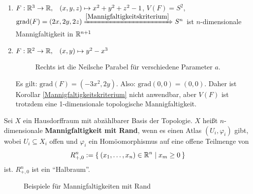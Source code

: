 \begin{beispiel}
    \begin{enumerate}[label=\alph*)]
        \item $F: \mathbb{R}^3 \rightarrow \mathbb{R},\;\;\; (x, y, z) \mapsto x^2 + y^2 + z^2 - 1$,
              $V(F) = S^2$, $\text{grad}(F) = (2x, 2y, 2z) \xRightarrow{\ref{Mannigfaltigkeitskriterium}} S^n$
              ist $n$-dimensionale Mannigfaltigkeit in $\mathbb{R}^{n+1}$
        \item $F: \mathbb{R}^2 \rightarrow \mathbb{R}, \;\;\; (x,y) \mapsto y^2 - x^3$
            \begin{figure}[ht]
                \centering
                \subfloat[$F(x,y) = y^2 - x^3$]{
                    
                    \label{fig:semicubical-parabola-2d}
                }%
                \subfloat[$y^2 - ax^3 = 0$]{
                    
                    \label{fig:semicubical-parabola-3d}
                }%
                \label{Neilsche-Parabel}
                \caption{Rechts ist die Neilsche Parabel für verschiedene Parameter $a$.}
            \end{figure}
              Es gilt: $\text{grad}(F) = (-3x^2, 2y)$. Also: $\text{grad}(0,0) = (0,0)$.
              Daher ist Korollar \ref{Mannigfaltigkeitskriterium}
              nicht anwendbar, aber $V(F)$ ist trotzdem
              eine 1-dimensionale topologische Mannigfaltigkeit.
    \end{enumerate}
\end{beispiel}

\begin{definition}
    Sei $X$ ein Hausdorffraum mit abzählbarer Basis der Topologie.
    $X$ heißt $n$-dimensionale \textbf{Mannigfaltigkeit mit Rand},
    wenn es einen Atlas $(U_i, \varphi_i)$ gibt, wobei $U_i \subseteq X_i$
    offen und $\varphi_i$ ein Homöomorphismus auf eine offene 
    Teilmenge von 
    \[R_{+,0}^n := \Set{(x_1, \dots, x_n) \in \ensuremath{\mathbb{R}}^n | x_m \geq 0}\]
    ist. $R_{+,0}^n$ ist ein \enquote{Halbraum}.
\end{definition}

\begin{figure}[ht]
    \centering
    \subfloat[Halbraum]{
        
        \label{fig:half-space}
    }%

    \label{Mannigfaltigkeiten mit Rand}
    \caption{Beispiele für Mannigfaltigkeiten mit Rand}
\end{figure}

